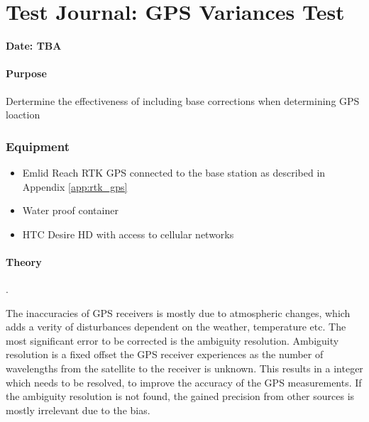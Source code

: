 \chapter{Test Journal: GPS Variances Test} \label{app:GPSImprovement}

\textbf{Date: TBA}

\subsubsection*{Purpose}
Dertermine the effectiveness of including base corrections when determining GPS loaction
\subsection*{Equipment}
\begin{itemize}
	\item Emlid Reach RTK GPS connected to the base station as described in Appendix \ref{app:rtk_gps}
    \item Water proof container
    \item HTC Desire HD with access to cellular networks
\end{itemize}

\subsubsection*{Theory}
\cite{RTK_GPS}\cite{ambg_res}\cite{GPS_errors}\cite{novatel}.

The inaccuracies of GPS receivers is mostly due to atmospheric changes, which adds a verity of disturbances dependent on the weather, temperature etc.
The most significant error to be corrected is the ambiguity resolution. 
Ambiguity resolution is a fixed offset the GPS receiver experiences as the number of wavelengths from the satellite to the receiver is unknown. 
This results in a integer which needs to be resolved, to improve the accuracy of the GPS measurements. 
If the ambiguity resolution is not found, the gained precision from other sources is mostly irrelevant due to the bias.\cite{novatel}\cite{RTK_GPS}\cite{ambg_res}

